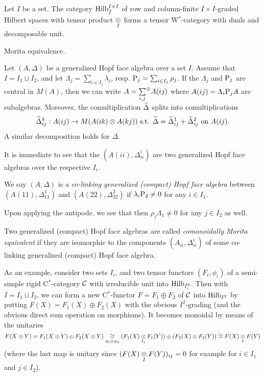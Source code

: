 \begin{Exa} Let $I$ be a set. The category $\mathrm{Hilb}_f^{I\times I}$ of row and column-finite $I\times I$-graded Hilbert spaces with tensor product $\underset{I}{\otimes}$ forms a tensor W$^*$-category with duals and decomposable unit. 
\end{Exa}

\begin{Exa} Morita equivalence.
\end{Exa}

Let $(A,\Delta)$ be a generalized Hopf face algebra over a set $I$. Assume that $I = I_1\sqcup I_2$, and let $\Lambda_j = \sum_{i\in I_j}\lambda_i$, resp. $\mathrm{P}_j = \sum_{i\in I_j} \rho_j$. If the $\Lambda_j$ and $\mathrm{P}_j$ are central in $M(A)$, then we can write $A = \underset{i,j}{\sum}^{\oplus} A(ij)$ where $A(ij) = \Lambda_i\mathrm{P}_jA$ are subalgebras. Moreover, the comultiplication $\widetilde{\Delta}$ splits into comultiplications \[\widetilde{\Delta}_{ij}^k:A(ij)\rightarrow M(A(ik)\otimes A(kj))\textrm{ s.t. } \widetilde{\Delta} = \widetilde{\Delta}_{ij}^1 +\widetilde{\Delta}_{ij}^2 \textrm{ on }A(ij).\] A similar decomposition holds for $\Delta$.

It is immediate to see that the $(A(ii),\Delta_{ii}^i)$ are two generalized Hopf face algebras over the respective $I_i$.

\begin{Def} We say $(A,\Delta)$ is a \emph{co-linking generalized (compact) Hopf face algebra} between $(A(11),\Delta_{11}^1)$ and $(A(22),\Delta_{22}^2)$ if $\lambda_i\mathrm{P}_2\neq 0$ for any $i\in I_1$.
\end{Def}

Upon applying the antipode, we see that then $\rho_j\Lambda_1\neq 0$ for any $j\in I_2$ as well.

\begin{Def} Two generalized (compact) Hopf face algebras are called \emph{comonoidally Morita equivalent} if they are isomorphic to the components $(A_{ii},\Delta_{ii}^i)$ of some co-linking generalized (compact) Hopf face algebra.\end{Def}

As an example, consider two sets $I_i$, and two tensor functors $(F_i,\phi_i)$ of a semi-simple rigid C$^*$-category $\mathcal{C}$ with irreducible unit into $\mathrm{Hilb}_{I_i^2}$. Then with $I= I_1\sqcup I_2$, we can form a new C$^*$-functor $F=F_1\oplus F_2$ of $\mathcal{C}$ into $\mathrm{Hilb}_{I^2}$ by putting $F(X) = F_1(X)\oplus F_2(X)$ with the obvious $I^2$-grading (and the obvious direct sum operation on morphisms). It becomes monoidal by means of the unitaries \[F(X\otimes Y) = F_1(X\otimes Y)\oplus F_2(X\otimes Y) \underset{\phi_1\oplus \phi_2}{\cong} (F_1(X)\underset{I_1}{\otimes} F_1(Y)) \oplus (F_2(X)\otimes F_2(Y)) \cong F(X)\underset{I}{\otimes} F(Y)\] (where the last map is unitary since $(F(X)\underset{I}{\otimes} F(Y))_{ij}=0$ for example for $i\in I_1$ and $j\in I_2$).

